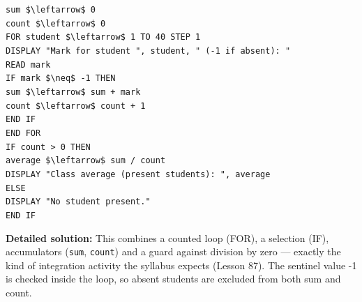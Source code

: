 \documentclass[11pt]{article}
\begin{document}
\begin{exoresolu}
\begin{flushleft}
\texttt{sum \$\textbackslash{}leftarrow\$ 0}\\
\texttt{count \$\textbackslash{}leftarrow\$ 0}\\
\texttt{FOR student \$\textbackslash{}leftarrow\$ 1 TO 40 STEP 1}\\
\quad\texttt{DISPLAY "Mark for student ", student, " (-1 if absent): "}\\
\quad\texttt{READ mark}\\
\quad\texttt{IF mark \$\textbackslash{}neq\$ -1 THEN}\\
\quad\quad\texttt{sum \$\textbackslash{}leftarrow\$ sum + mark}\\
\quad\quad\texttt{count \$\textbackslash{}leftarrow\$ count + 1}\\
\quad\texttt{END IF}\\
\texttt{END FOR}\\
\texttt{IF count > 0 THEN}\\
\quad\texttt{average \$\textbackslash{}leftarrow\$ sum / count}\\
\quad\texttt{DISPLAY "Class average (present students): ", average}\\
\texttt{ELSE}\\
\quad\texttt{DISPLAY "No student present."}\\
\texttt{END IF}
\end{flushleft}
\tcblower
\textbf{Detailed solution:} This combines a counted loop (FOR), a selection (IF), accumulators (\texttt{sum}, \texttt{count}) and a guard against division by zero — exactly the kind of integration activity the syllabus expects (Lesson 87). The sentinel value -1 is checked inside the loop, so absent students are excluded from both sum and count.
\end{exoresolu}
\end{document}
